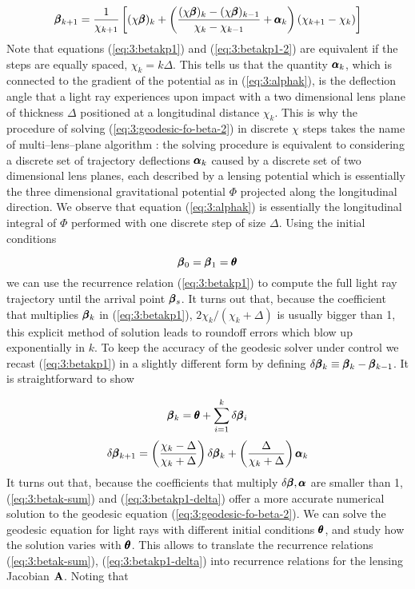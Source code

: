 \begin{equation}
\label{eq:3:betakp1-2}
\pmb{\beta}_{k+1} = \frac{1}{\chi_{k+1}}\left[(\chi\pmb{\beta})_{k} + \left(\frac{(\chi\pmb{\beta})_{k}-(\chi\pmb{\beta})_{k-1}}{\chi_k-\chi_{k-1}}+\pmb{\alpha}_k\right)(\chi_{k+1}-\chi_k) \right]
\end{equation}
%
Note that equations (\ref{eq:3:betakp1}) and (\ref{eq:3:betakp1-2}) are equivalent if the steps are equally spaced, $\chi_k=k\Delta$. This tells us that the quantity $\pmb{\alpha}_k$, which is connected to the gradient of the potential as in (\ref{eq:3:alphak}), is the deflection angle that a light ray experiences upon impact with a two dimensional lens plane of thickness $\Delta$ positioned at a longitudinal distance $\chi_k$. This is why the procedure of solving (\ref{eq:3:geodesic-fo-beta-2}) in discrete $\chi$ steps takes the name of multi--lens--plane algorithm \citep{RayTracingJain,RayTracingHartlap}: the solving procedure is equivalent to considering a discrete set of trajectory deflections $\pmb{\alpha}_k$ caused by a discrete set of two dimensional lens planes, each described by a lensing potential which is essentially the three dimensional gravitational potential $\Phi$ projected along the longitudinal direction. We observe that equation (\ref{eq:3:alphak}) is essentially the longitudinal integral of $\Phi$ performed with one discrete step of size $\Delta$. Using the initial conditions

\begin{equation}
\label{eq:3:initcond}
\pmb{\beta}_0 = \pmb{\beta}_1 = \pmb{\theta} 
\end{equation}    
%
we can use the recurrence relation (\ref{eq:3:betakp1}) to compute the full light ray trajectory until the arrival point $\pmb{\beta}_s$. It turns out that, because the coefficient that multiplies $\pmb{\beta}_k$ in (\ref{eq:3:betakp1}), $2\chi_k/(\chi_k+\Delta)$ is usually bigger than 1, this explicit method of solution leads to roundoff errors which blow up exponentially in $k$. To keep the accuracy of the geodesic solver under control we recast (\ref{eq:3:betakp1}) in a slightly different form by defining $\delta\pmb{\beta}_k \equiv \pmb{\beta}_k-\pmb{\beta}_{k-1}$. It is straightforward to show

\begin{equation}
\label{eq:3:betak-sum}
\pmb{\beta}_k = \pmb{\theta} + \sum_{i=1}^k\delta\pmb{\beta}_i
\end{equation}
%
\begin{equation}
\label{eq:3:betakp1-delta}
\delta\pmb{\beta}_{k+1} = \left(\frac{\chi_k-\Delta}{\chi_k+\Delta}\right)\delta\pmb{\beta}_k + \left(\frac{\Delta}{\chi_k+\Delta}\right)\pmb{\alpha}_k
\end{equation} 
%
It turns out that, because the coefficients that multiply $\delta\pmb{\beta},\pmb{\alpha}$ are smaller than 1, (\ref{eq:3:betak-sum}) and (\ref{eq:3:betakp1-delta}) offer a more accurate numerical solution to the geodesic equation (\ref{eq:3:geodesic-fo-beta-2}). We can solve the geodesic equation for light rays with different initial conditions $\pmb{\theta}$, and study how the solution varies with $\pmb{\theta}$. This allows to translate the recurrence relations (\ref{eq:3:betak-sum}), (\ref{eq:3:betakp1-delta}) into recurrence relations for the lensing Jacobian $\mathbf{A}$. Noting that 

